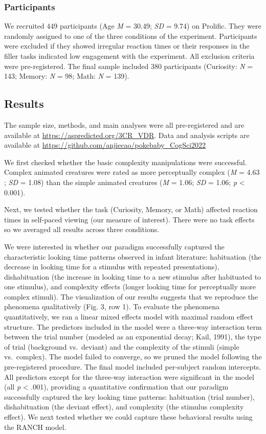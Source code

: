 \documentclass[10pt, letterpaper]{article}
\begin{document}
\hypertarget{participants}{%
\subsubsection{Participants}\label{participants}}

We recruited 449 participants (Age \emph{M} = 30.49; \emph{SD} = 9.74)
on Prolific. They were randomly assigned to one of the three conditions
of the experiment. Participants were excluded if they showed irregular
reaction times or their responses in the filler tasks indicated low
engagement with the experiment. All exclusion criteria were
pre-registered. The final sample included 380 participants (Curiosity:
\emph{N} = 143; Memory: \emph{N} = 98; Math: \emph{N} = 139).

\hypertarget{results}{%
\subsection{Results}\label{results}}

The sample size, methods, and main analyses were all pre-registered and
are available at \url{https://aspredicted.org/3CR_VDR}. Data and
analysis scripts are available at
\url{https://github.com/anjiecao/pokebaby_CogSci2022}

We first checked whether the basic complexity manipulations were
successful. Complex animated creatures were rated as more perceptually
complex (\emph{M} = 4.63 ; \emph{SD} = 1.08) than the simple animated
creatures (\emph{M} = 1.06; \emph{SD} = 1.06; \emph{p} \textless{}
0.001).

Next, we tested whether the task (Curiosity, Memory, or Math) affected
reaction times in self-paced viewing (our measure of interest). There
were no task effects so we averaged all results across three conditions.

We were interested in whether our paradigm successfully captured the
characteristic looking time patterns observed in infant literature:
habituation (the decrease in looking time for a stimulus with repeated
presentations), dishabituation (the increase in looking time to a new
stimulus after habituated to one stimulus), and complexity effects
(longer looking time for perceptually more complex stimuli). The
visualization of our results suggests that we reproduce the phenomena
qualitatively (Fig. 3, row 1). To evaluate the phenomena quantitatively,
we ran a linear mixed effects model with maximal random effect
structure. The predictors included in the model were a three-way
interaction term between the trial number (modeled as an exponential
decay; Kail, 1991), the type of trial (background vs.~deviant) and the
complexity of the stimuli (simple vs.~complex). The model failed to
converge, so we pruned the model following the pre-registered procedure.
The final model included per-subject random intercepts. All predictors
except for the three-way interaction were significant in the model (all
\emph{p} \textless{} .001), providing a quantitative confirmation that
our paradigm successfully captured the key looking time patterns:
habituation (trial number), dishabituation (the deviant effect), and
complexity (the stimulus complexity effect). We next tested whether we
could capture these behavioral results using the RANCH model.
\end{document}
